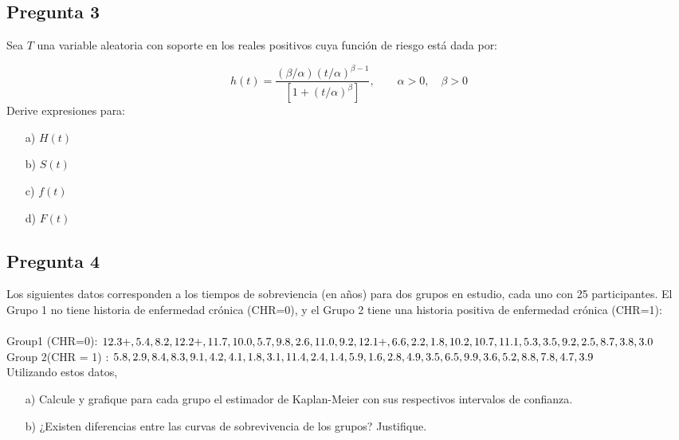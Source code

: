 \documentclass[10pt]{article}\usepackage[]{graphicx}\usepackage[]{color}
\begin{document}
\subsection*{Pregunta 3} 
Sea $T$ una variable aleatoria con soporte en los reales positivos cuya función de riesgo está dada por:

$$h(t)=\frac{(\beta/\alpha)(t/\alpha)^{\beta-1}}{[1+(t/\alpha)^{\beta}]}, \qquad \alpha>0, \quad \beta>0$$ 
Derive expresiones para:

\begin{itemize} 
\item[a)] $H(t)$
\item[b)] $S(t)$
\item[c)] $f(t)$
\item[d)] $F(t)$
\end{itemize}

\subsection*{Pregunta 4} 
Los siguientes datos corresponden a los tiempos de sobreviencia (en años) para dos grupos en estudio, cada uno con 25 participantes. El Grupo 1 no tiene historia de enfermedad crónica (CHR=0), y el Grupo 2 tiene una historia positiva de enfermedad crónica (CHR=1):\\
\\
Group1 (CHR=0): $12.3+,5.4, 8.2, 12.2+, 11.7, 10.0, 5.7, 9.8, 2.6, 11.0, 9.2, 12.1+, 6.6, \\
2.2, 1.8, 10.2, 10.7, 11.1, 5.3, 3.5, 9.2, 2.5, 8.7, 3.8, 3.0$\\

Group 2(CHR = 1) : $5.8, 2.9, 8.4, 8.3, 9.1, 4.2, 4.1, 1.8, 3.1, 11.4, 2.4, 1.4, 5.9, \\
1.6, 2.8, 4.9, 3.5, 6.5, 9.9, 3.6, 5.2, 8.8, 7.8, 4.7, 3.9$\\ 
Utilizando estos datos,

\begin{itemize} 

\item[a)] Calcule y grafique para cada grupo el estimador de Kaplan-Meier con sus respectivos intervalos de confianza.
\item[b)] ¿Existen diferencias entre las curvas de sobrevivencia de los grupos? Justifique. 

\end{itemize}
\end{document}
